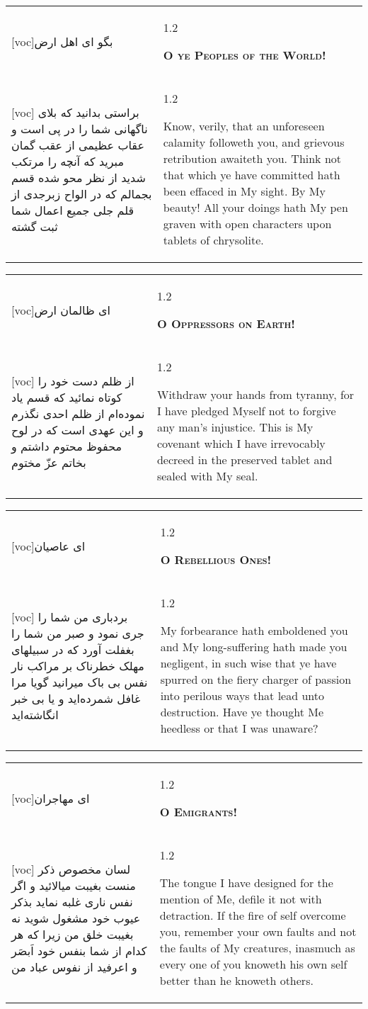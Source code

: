 \documentclass[11pt]{article}
\makeatletter
\newenvironment{orig}
  {\begin{farsi}[voc]}
  {\end{farsi}}
\newenvironment{trans}
  {\Large\begin{spacing}{1.2}\raggedright}
  {\end{spacing}}
\newenvironment{word}
  {\begin{tabular}[t]{p{2.75in}@{\hspace{3em}}p{2.75in}}}
  {\end{tabular}}
\newcommand{\ayat}[2]{\begin{orig}#1\end{orig} & \begin{trans}#2\end{trans}}
\newcommand{\heading}[2]{\textsc{\textbf{#1}} %
}
\makeatother
\begin{document}
\pagebreak

\begin{word}
\ayat{بگو ای اهل ارض}{\heading{O ye Peoples of the World!}{}} \\ \ayat{
براستی بدانيد که بلای ناگهانی شما را در پی است و عقاب عظيمی از عقب
گمان مبريد که آنچه را مرتکب شديد از نظر محو شده
قسم بجمالم که در الواح زبرجدی از قلم جلی جميع اعمال شما ثبت گشته
}{
  Know, verily, that an unforeseen calamity followeth you, and grievous
  retribution awaiteth you. Think not that which ye have committed hath been
  effaced in My sight. By My beauty! All your doings hath My pen graven with
  open characters upon tablets of chrysolite.
}
\end{word}

\pagebreak

\begin{word}
\ayat{ای ظالمان ارض}{\heading{O Oppressors on Earth!}{}} \\ \ayat{
از ظلم دست خود را کوتاه نمائيد که قسم ياد نموده‌ام از ظلم احدی نگذرم و اين عهدی است که در لوح محفوظ محتوم داشتم و بخاتم عزّ مختوم
}{
  Withdraw your hands from tyranny, for I have pledged Myself not to forgive
  any man's injustice. This is My covenant which I have irrevocably decreed in
  the preserved tablet and sealed with My seal.
}
\end{word}

\pagebreak

\begin{word}
\ayat{ای عاصيان}{\heading{O Rebellious Ones!}{}} \\ \ayat{
بردباری من شما را جری نمود و صبر من شما را بغفلت آورد که در سبيلهای مهلک خطرناک بر مراکب نار نفس بی باک ميرانيد گويا مرا غافل شمرده‌ايد و يا بی خبر انگاشته‌ايد
}{
  My forbearance hath emboldened you and My long-suffering hath made you
  negligent, in such wise that ye have spurred on the fiery charger of passion
  into perilous ways that lead unto destruction. Have ye thought Me heedless
  or that I was unaware?
}
\end{word}

\pagebreak

\begin{word}
\ayat{ای مهاجران}{\heading{O Emigrants!}{}} \\ \ayat{
لسان مخصوص ذکر منست بغيبت ميالائيد و اگر نفس ناری غلبه نمايد بذکر عيوب خود مشغول شويد نه بغيبت خلق من زيرا که هر کدام از شما بنفس خود اَبصَر و اعرفيد از نفوس عباد من
}{
  The tongue I have designed for the mention of Me, defile it not with
  detraction. If the fire of self overcome you, remember your own faults and
  not the faults of My creatures, inasmuch as every one of you knoweth his own
  self better than he knoweth others.
}
\end{word}
\end{document}
